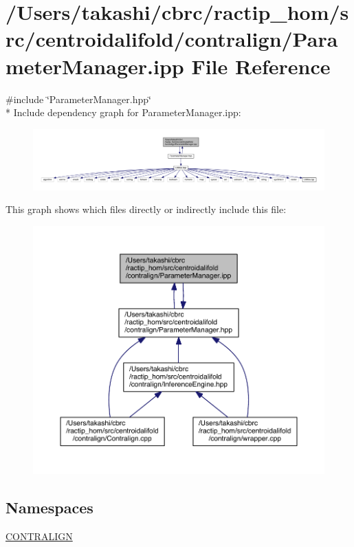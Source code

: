 \hypertarget{centroidalifold_2contralign_2_parameter_manager_8ipp}{\section{/\+Users/takashi/cbrc/ractip\+\_\+hom/src/centroidalifold/contralign/\+Parameter\+Manager.ipp File Reference}
\label{centroidalifold_2contralign_2_parameter_manager_8ipp}
}
{\ttfamily \#include \char`\"{}Parameter\+Manager.\+hpp\char`\"{}}\\*
Include dependency graph for Parameter\+Manager.\+ipp\+:
\nopagebreak
\begin{figure}[H]
\begin{center}
\leavevmode
\includegraphics[width=350pt]{centroidalifold_2contralign_2_parameter_manager_8ipp__incl}
\end{center}
\end{figure}
This graph shows which files directly or indirectly include this file\+:
\nopagebreak
\begin{figure}[H]
\begin{center}
\leavevmode
\includegraphics[width=350pt]{centroidalifold_2contralign_2_parameter_manager_8ipp__dep__incl}
\end{center}
\end{figure}
\subsection*{Namespaces}
\begin{DoxyCompactItemize}
\item 
 \hyperlink{namespace_c_o_n_t_r_a_l_i_g_n}{C\+O\+N\+T\+R\+A\+L\+I\+G\+N}
\end{DoxyCompactItemize}
